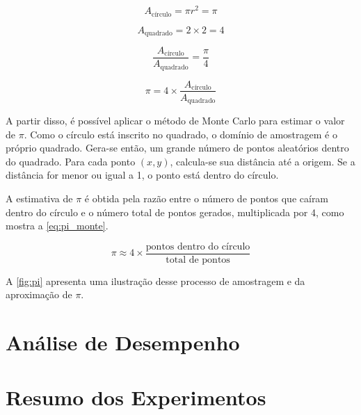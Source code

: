 \begin{equation}
	\label{eq:area_circle}
	A_{\text{círculo}} = \pi r^2 = \pi
\end{equation}

\begin{equation}
	\label{eq:area_square}
	A_{\text{quadrado}} = 2 \times 2 = 4
\end{equation}

\begin{equation}
	\label{eq:rational_area}
	\frac{A_{\text{círculo}}}{A_{\text{quadrado}}} = \frac{\pi}{4}
\end{equation}

\begin{equation}
	\label{eq:rational_pi}
	\pi = 4 \times \frac{A_{\text{círculo}}}{A_{\text{quadrado}}}
\end{equation}

A partir disso, é possível aplicar o método de Monte Carlo para estimar o valor de $\pi$. Como o círculo está inscrito no quadrado, o domínio de amostragem é o próprio quadrado. Gera-se então, um grande número de pontos aleatórios dentro do quadrado. Para cada ponto $(x, y)$, calcula-se sua distância até a origem. Se a distância for menor ou igual a 1, o ponto está dentro do círculo.

A estimativa de $\pi$ é obtida pela razão entre o número de pontos que caíram dentro do círculo e o número total de pontos gerados, multiplicada por 4, como mostra a \autoref{eq:pi_monte}.

\begin{equation}
	\label{eq:pi_monte}
	\pi \approx 4 \times \frac{\text{pontos dentro do círculo}}{\text{total de pontos}}
\end{equation}

A \autoref{fig:pi} apresenta uma ilustração desse processo de amostragem e da aproximação de $\pi$.

\section{Análise de Desempenho}\label{sec:desempenho}

\section{Resumo dos Experimentos}\label{sec:resumo_exp}
